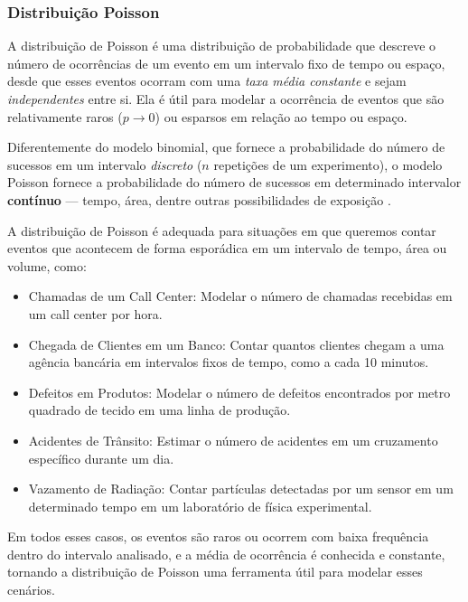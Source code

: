 \subsubsection{Distribuição Poisson}

A distribuição de Poisson é uma distribuição de probabilidade que descreve o
número de ocorrências de um evento em um intervalo fixo de tempo ou espaço,
desde que esses eventos ocorram com uma \emph{taxa média constante} e sejam
\emph{independentes} entre si. Ela é útil para modelar a ocorrência de eventos
que são relativamente raros ($p \rightarrow 0$) ou esparsos em relação ao tempo
ou espaço.

Diferentemente do modelo binomial, que fornece a probabilidade do número de
sucessos em um intervalo \emph{discreto} ($n$ repetições de um experimento), o
modelo Poisson fornece a probabilidade do número de sucessos em determinado
intervalor \textbf{contínuo} --- tempo, área, dentre outras possibilidades de
exposição \parencite[p.~324]{favero}.

A distribuição de Poisson é adequada para situações em que queremos contar
eventos que acontecem de forma esporádica em um intervalo de tempo, área ou
volume, como:

\begin{itemize}
\item Chamadas de um Call Center: Modelar o número de chamadas recebidas em um call center por hora.
\item Chegada de Clientes em um Banco: Contar quantos clientes chegam a uma agência bancária em intervalos fixos de tempo, como a cada 10 minutos.
\item Defeitos em Produtos: Modelar o número de defeitos encontrados por metro quadrado de tecido em uma linha de produção.
\item Acidentes de Trânsito: Estimar o número de acidentes em um cruzamento específico durante um dia.
\item Vazamento de Radiação: Contar partículas detectadas por um sensor em um determinado tempo em um laboratório de física experimental.
\end{itemize}

Em todos esses casos, os eventos são raros ou ocorrem com baixa frequência
dentro do intervalo analisado, e a média de ocorrência é conhecida e constante,
tornando a distribuição de Poisson uma ferramenta útil para modelar esses
cenários.

